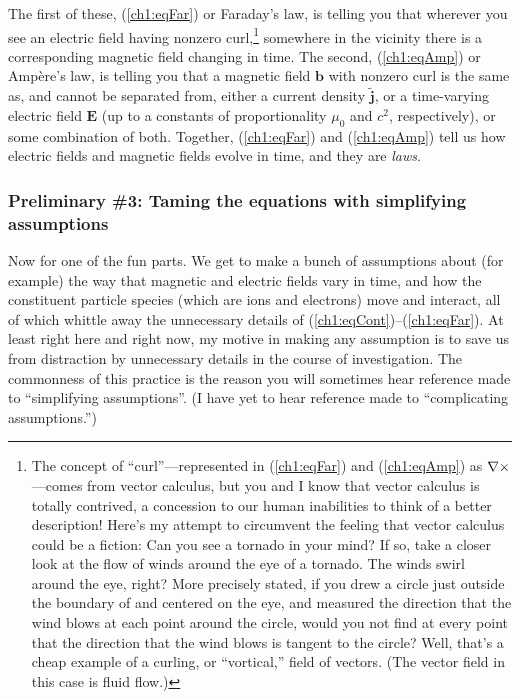 The first of these, (\ref{ch1:eqFar}) or Faraday's law, is telling you that
wherever you see an electric field having nonzero curl,\footnote{The concept of
  ``curl''---represented in (\ref{ch1:eqFar}) and (\ref{ch1:eqAmp}) as
  ${\bf \nabla} \times$---comes from vector calculus, but you and I know that vector
  calculus is totally contrived, a concession to our human inabilities to think
  of a better description! Here's my attempt to circumvent the feeling that
  vector calculus could be a fiction: Can you see a tornado in your mind? If so,
  take a closer look at the flow of winds around the eye of a tornado. The winds
  swirl around the eye, right? More precisely stated, if you drew a circle just
  outside the boundary of and centered on the eye, and measured the direction
  that the wind blows at each point around the circle, would you not find at
  every point that the direction that the wind blows is tangent to the circle?
  Well, that's a cheap example of a curling, or ``vortical,'' field of
  vectors. (The vector field in this case is fluid flow.)  } somewhere in the
vicinity there is a corresponding magnetic field changing in time. The second,
(\ref{ch1:eqAmp}) or Amp\`{e}re's law, is telling you that a magnetic field
$\mathbf{b}$ with nonzero curl is the same as, and cannot be separated from,
either a current density $\mathbf{\tilde j}$, or a time-varying electric field
$\mathbf{E}$ (up to a constants of proportionality $\mu_0$ and $c^2$,
respectively), or some combination of both. Together, (\ref{ch1:eqFar}) and
(\ref{ch1:eqAmp}) tell us how electric fields and magnetic fields evolve in
time, and they are \emph{laws}.

\subsubsection{Preliminary \#3: Taming the equations with simplifying assumptions} \label{ch1:sssAssume}

Now for one of the fun parts. We get to make a bunch of assumptions about (for
example) the way that magnetic and electric fields vary in time, and how the
constituent particle species (which are ions and electrons) move and interact,
all of which whittle away the unnecessary details of
(\ref{ch1:eqCont})--(\ref{ch1:eqFar}). At least right here and right now, my
motive in making any assumption is to save us from distraction by unnecessary
details in the course of investigation. The commonness of this practice is the
reason you will sometimes hear reference made to ``simplifying assumptions''. (I
have yet to hear reference made to ``complicating assumptions.'')


